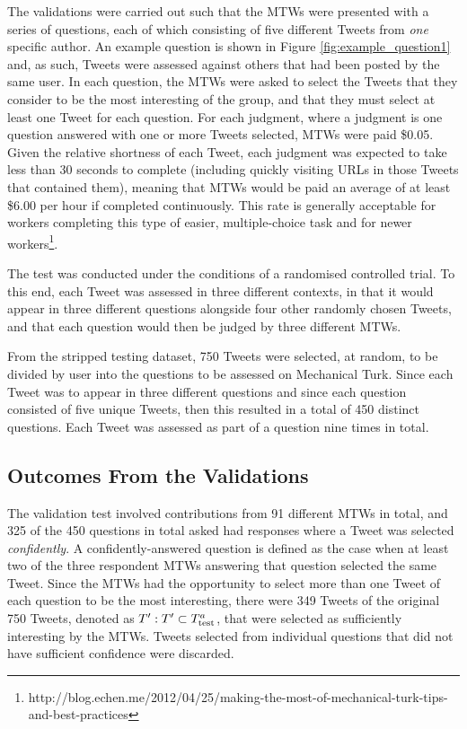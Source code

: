 The validations were carried out such that the MTWs were presented with a series of questions, each of which consisting of five different Tweets from \textit{one} specific author. An example question is shown in Figure \ref{fig:example_question1} and, as such, Tweets were assessed against others that had been posted by the same user. In each question, the MTWs were asked to select the Tweets that they consider to be the most interesting of the group, and that they must select at least one Tweet for each question. For each judgment, where a judgment is one question answered with one or more Tweets selected, MTWs were paid \$0.05. Given the relative shortness of each Tweet, each judgment was expected to take less than 30 seconds to complete (including quickly visiting URLs in those Tweets that contained them), meaning that MTWs would be paid an average of at least \$6.00 per hour if completed continuously. This rate is generally acceptable for workers completing this type of easier, multiple-choice task and for newer workers\footnote{http://blog.echen.me/2012/04/25/making-the-most-of-mechanical-turk-tips-and-best-practices}.

The test was conducted under the conditions of a randomised controlled trial. To this end, each Tweet was assessed in three different contexts, in that it would appear in three different questions alongside four other randomly chosen Tweets, and that each question would then be judged by three different MTWs.

From the stripped testing dataset, 750 Tweets were selected, at random, to be divided by user into the questions to be assessed on Mechanical Turk. Since each Tweet was to appear in three different questions and since each question consisted of five unique Tweets, then this resulted in a total of 450 distinct questions. Each Tweet was assessed as part of a question nine times in total. 


\subsection{Outcomes From the Validations}
The validation test involved contributions from 91 different MTWs in total, and 325 of the 450 questions in total asked had responses where a Tweet was selected \textit{confidently}. A confidently-answered question is defined as the case when at least two of the three respondent MTWs answering that question selected the same Tweet. Since the MTWs had the opportunity to select more than one Tweet of each question to be the most interesting, there were 349 Tweets of the original 750 Tweets, denoted as $T' : T' \subset T^a_{\textrm{test}}{}$, that were selected as sufficiently interesting by the MTWs. Tweets selected from individual questions that did not have sufficient confidence were discarded.

